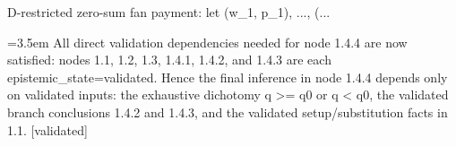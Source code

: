 \documentclass{article}
\newcommand{\step}[1]{\par\noindent\hangindent=3.5em\hangafter=1%
  \makebox[3.5em][l]{\textbf{#1.}}}
\newcommand{\steptag}[1]{\hfill{\small\textsf{[#1]}}}
\begin{document}
\begin{proofbox}{D-restricted zero-sum fan payment: let (w\_1, p\_1), ..., (...}
\step{1.4.4.2} All direct validation dependencies needed for node 1.4.4 are now satisfied: nodes 1.1, 1.2, 1.3, 1.4.1, 1.4.2, and 1.4.3 are each epistemic\_state=validated. Hence the final inference in node 1.4.4 depends only on validated inputs: the exhaustive dichotomy q >= q0 or q < q0, the validated branch conclusions 1.4.2 and 1.4.3, and the validated setup/substitution facts in 1.1. \steptag{validated} \\[4pt]
\end{proofbox}
\end{document}
